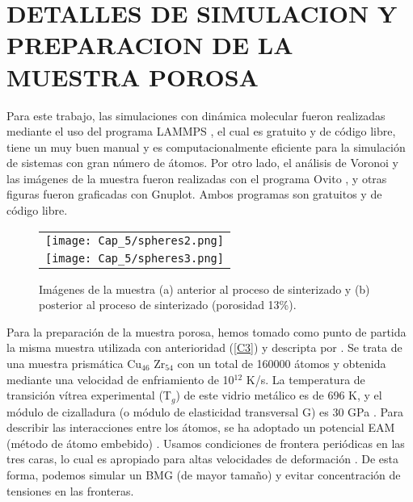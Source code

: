 
\section{DETALLES DE SIMULACION Y PREPARACION DE LA MUESTRA POROSA}
\label{S5_2}

Para este trabajo, las simulaciones con dinámica molecular fueron realizadas mediante el uso del programa LAMMPS \citep{plimpton95},
el cual es gratuito y de código libre, tiene un muy buen manual y es computacionalmente eficiente para la simulación de sistemas
con gran número de átomos. Por otro lado, el análisis de Voronoi y las imágenes de la muestra fueron realizadas con el programa Ovito
\citep{stukowski10}, y otras figuras fueron graficadas con Gnuplot. Ambos programas son gratuitos y de código libre.

\begin{figure}[h!]
  \centering
  \begin{tabular} {c}
    \texttt{[image: Cap\_5/spheres2.png]}\\
    \texttt{[image: Cap\_5/spheres3.png]}\\
  \end{tabular}
  \caption{Imágenes de la muestra (a) anterior al proceso de sinterizado y (b) posterior al proceso de sinterizado (porosidad 13\%).}
  \label{C5:fg:sint}
\end{figure}

Para la preparación de la muestra porosa, hemos tomado como punto de partida la misma muestra utilizada con anterioridad (\ref{C3}) y
descripta por \cite{arman10}. Se trata de una muestra prismática Cu$_{46}$ Zr$_{54}$ con un total de 160000 átomos y obtenida
mediante una velocidad de enfriamiento de 10$^{12}$ K/s. La temperatura de transición vítrea experimental (T$_{g}$) de este vidrio metálico
es de 696 K, y el módulo de cizalladura (o módulo de elasticidad transversal G) es 30 GPa \citep{johnson05}. Para describir las interacciones
entre los átomos, se ha adoptado un potencial EAM (método de átomo embebido) \citep{daw84}. Usamos condiciones de frontera periódicas en las
tres caras, lo cual es apropiado para altas velocidades de deformación \citep{bringa05}. De esta forma, podemos simular un BMG (de mayor tamaño)
y evitar concentración de tensiones en las fronteras.


